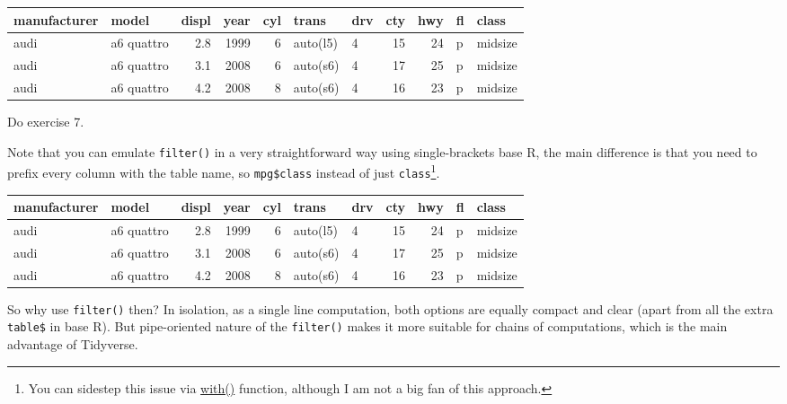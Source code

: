 \documentclass[
]{book}
\newenvironment{Shaded}{\begin{snugshade}}{\end{snugshade}}
\newcommand{\NormalTok}[1]{#1}
\newcommand{\SpecialCharTok}[1]{\textcolor[rgb]{0.00,0.00,0.00}{#1}}
\newcommand{\StringTok}[1]{\textcolor[rgb]{0.31,0.60,0.02}{#1}}
\begin{document}
\begin{tabular}{l|l|r|r|r|l|l|r|r|l|l}
\hline
manufacturer & model & displ & year & cyl & trans & drv & cty & hwy & fl & class\\
\hline
audi & a6 quattro & 2.8 & 1999 & 6 & auto(l5) & 4 & 15 & 24 & p & midsize\\
\hline
audi & a6 quattro & 3.1 & 2008 & 6 & auto(s6) & 4 & 17 & 25 & p & midsize\\
\hline
audi & a6 quattro & 4.2 & 2008 & 8 & auto(s6) & 4 & 16 & 23 & p & midsize\\
\hline
\end{tabular}

Do exercise 7.

Note that you can emulate \texttt{filter()} in a very straightforward way using single-brackets base R, the main difference is that you need to prefix every column with the table name, so \texttt{mpg\$class} instead of just \texttt{class}\footnote{You can sidestep this issue via \href{https://stat.ethz.ch/R-manual/R-devel/library/base/html/with.html}{with()} function, although I am not a big fan of this approach.}.

\begin{Shaded}
\end{Shaded}

\begin{tabular}{l|l|r|r|r|l|l|r|r|l|l}
\hline
manufacturer & model & displ & year & cyl & trans & drv & cty & hwy & fl & class\\
\hline
audi & a6 quattro & 2.8 & 1999 & 6 & auto(l5) & 4 & 15 & 24 & p & midsize\\
\hline
audi & a6 quattro & 3.1 & 2008 & 6 & auto(s6) & 4 & 17 & 25 & p & midsize\\
\hline
audi & a6 quattro & 4.2 & 2008 & 8 & auto(s6) & 4 & 16 & 23 & p & midsize\\
\hline
\end{tabular}

So why use \texttt{filter()} then? In isolation, as a single line computation, both options are equally compact and clear (apart from all the extra \texttt{table\$} in base R). But pipe-oriented nature of the \texttt{filter()} makes it more suitable for chains of computations, which is the main advantage of Tidyverse.
\end{document}
